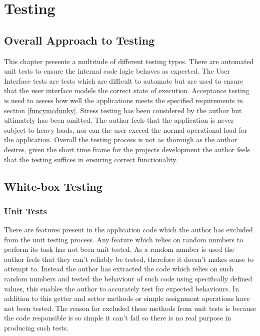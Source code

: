 \chapter{Testing}

\section{Overall Approach to Testing}

This chapter presents a multitude of different testing types. There are automated unit tests to ensure the internal code logic behaves as expected. The User Interface tests are tests which are difficult to automate but are used to ensure that the user interface models the correct state of execution. Acceptance testing is used to assess how well the applications meets the specified requirements in section \ref{funcymcdunky}. Stress testing has been considered by the author but ultimately has been omitted. The author feels that the application is never subject to heavy loads, nor can the user exceed the normal operational load for the application. Overall the testing process is not as thorough as the author desires, given the short time frame for the projects development the author feels that the testing suffices in ensuring correct functionality.

\section{White-box Testing}
\subsection{Unit Tests}

There are features present in the application code which the author has excluded from the unit testing process. Any feature which relies on random numbers to perform its task has not been unit tested. As a random number is used the author feels that they can’t reliably be tested, therefore it doesn’t makes sense to attempt to. Instead the author has extracted the code which relies on such random numbers and tested the behaviour of such code using specifically defined values, this enables the author to accurately test for expected behaviours. In addition to this getter and setter methods or simple assignment operations have not been tested. The reason for excluded these methods from unit tests is because the code responsible is so simple it can’t fail so there is no real purpose in producing such tests.

